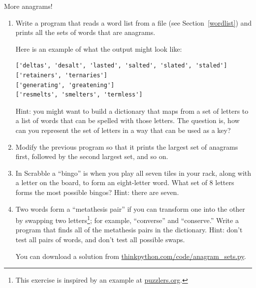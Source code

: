 \documentclass[10pt]{book}
\begin{document}
\begin{ex}
\label{anagrams}


More anagrams!

\begin{enumerate}

\item Write a program
that reads a word list from a file (see Section~\ref{wordlist}) and
prints all the sets of words that are anagrams.

Here is an example of what the output might look like:

\beforeverb
\begin{verbatim}
['deltas', 'desalt', 'lasted', 'salted', 'slated', 'staled']
['retainers', 'ternaries']
['generating', 'greatening']
['resmelts', 'smelters', 'termless']
\end{verbatim}
\afterverb
%
Hint: you might want to build a dictionary that maps from a
set of letters to a list of words that can be spelled with those
letters.  The question is, how can you represent the set of
letters in a way that can be used as a key?

\item Modify the previous program so that it prints the largest set
of anagrams first, followed by the second largest set, and so on.


\item In Scrabble a ``bingo'' is when you play all seven tiles in
your rack, along with a letter on the board, to form an eight-letter
word.  What set of 8 letters forms the most possible bingos?
Hint: there are seven.



\item Two words form a ``metathesis pair'' if you can transform one
  into the other by swapping two letters\footnote{This exercise is
    inspired by an example at \url{puzzlers.org}.}; for example,
  ``converse'' and ``conserve.''  Write a program that finds all of
  the metathesis pairs in the dictionary.  Hint: don't test all pairs
  of words, and don't test all possible swaps.

You can download a solution from \url{thinkpython.com/code/anagram_sets.py}.

\end{enumerate}
\end{ex}
\end{document}
